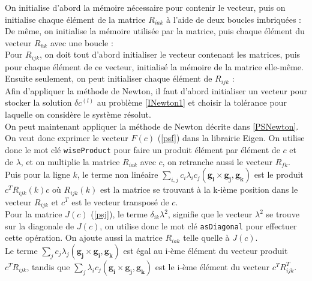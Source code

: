 On initialise d'abord la mémoire nécessaire pour contenir le vecteur, puis on initialise chaque élément de la matrice $R_{iak}$ à l'aide de deux boucles imbriquées :\\


De même, on initialise la mémoire utilisée par la matrice, puis chaque élément du vecteur $R_{hk}$ avec une boucle :\\


Pour $R_{ijk}$, on doit tout d'abord initialiser le vecteur contenant les matrices, puis pour chaque élément de ce vecteur, initialisé la mémoire de la matrice elle-même. Ensuite seulement, on peut initialiser chaque élément de $R_{ijk}$ :\\


Afin d'appliquer la méthode de Newton, il faut d'abord initialiser un vecteur pour stocker la solution $\delta c^{(l)}$ au problème \ref{INewton1} et choisir la tolérance pour laquelle on considère le système résolut.\\


On peut maintenant appliquer la méthode de Newton décrite dans \ref{PSNewton}. On veut donc exprimer le vecteur $F(c)$ (\ref{psf}) dans la librairie Eigen. On utilise donc le mot clé \texttt{wiseProduct} pour faire un produit élément par élément de $c$ et de $\lambda$, et on multiplie la matrice $R_{iak}$ avec $c$, on retranche aussi le vecteur $R_{fk}$.\\
Puis pour la ligne $k$, le terme non linéaire $\sum_{i,j} c_i\lambda_i c_j (\mathbf{g_i}\times \mathbf{g_j}, \mathbf{g_k})$ est le produit $c^TR_{ijk}(k)c$ où $R_{ijk}(k)$ est la matrice se trouvant à la k-ième position dans le vecteur $R_{ijk}$ et $c^T$ est le vecteur transposé de $c$.\\


Pour la matrice $J(c)$ (\ref{psj}), le terme $\delta_{ik}\lambda^2$, signifie que le vecteur $\lambda^2$ se trouve sur la diagonale de $J(c)$, on utilise donc le mot clé \texttt{asDiagonal} pour effectuer cette opération. On ajoute aussi la matrice $R_{iak}$ telle quelle à $J(c)$.\\
Le terme $\sum_j c_j\lambda_j (\mathbf{g_j}\times\mathbf{g_i},\mathbf{g_k})$ est égal au i-ème élément du vecteur produit $c^TR_{ijk}$, tandis que $\sum_j\lambda_i c_j (\mathbf{g_i}\times\mathbf{g_j},\mathbf{g_k})$ est le i-ème élément du vecteur $c^TR_{ijk}^T$.\\


